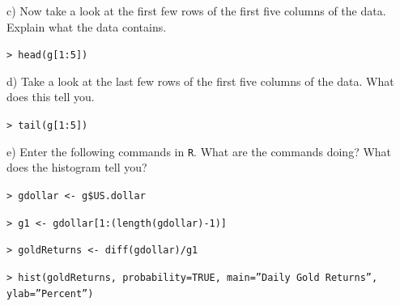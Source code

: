 \documentclass[10pt]{article}
\begin{document}
\HX c) Now take a look at the first few rows of the first five columns of the data.
Explain what the data contains.

\HX\HX \texttt{>  head(g[1:5])}

\HX d)  Take a look at the last few rows of the first five columns of the data.
What does this tell you.

\HX\HX \texttt{>  tail(g[1:5])}

\HX e) Enter the following commands in \texttt{R}.  What are the commands doing?
What does the histogram tell you?

\HX\HX \texttt{>  gdollar <- g\$US.dollar}

\HX\HX \texttt{>  g1 <- gdollar[1:(length(gdollar)-1)]}

\HX\HX \texttt{>  goldReturns <- diff(gdollar)/g1}

\HX\HX \texttt{>  hist(goldReturns, probability=TRUE, main=''Daily Gold Returns'', ylab=''Percent'')}
\end{document}
